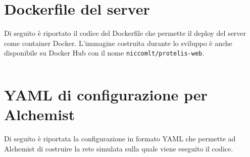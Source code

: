\addpart{\appendixname}



\appendix
\begin{appendices}

  \chapter{Dockerfile del server}\label{app:docker}

    Di seguito è riportato il codice del Dockerfile che permette il deploy del server come container Docker.
    L'immagine costruita durante lo sviluppo è anche disponibile su Docker Hub con il nome \texttt{niccomlt/protelis-web}.

    \inputminted{dockerfile}{res/code/Dockerfile}

  \chapter{YAML di configurazione per Alchemist}\label{app:yaml}

    Di seguito è riportata la configurazione in formato YAML che permette ad Alchemist di costruire la rete simulata sulla quale viene eseguito il codice.

    \inputminted{yaml}{res/code/simulation.yml}

\end{appendices}
